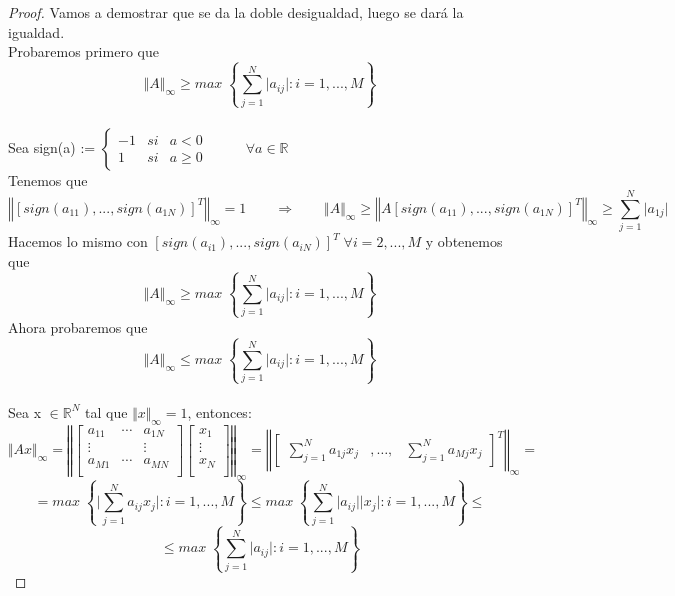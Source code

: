 \begin{proof} Vamos a demostrar que se da la doble desigualdad, luego se dará la igualdad.\\
Probaremos primero que $$ \Vert A \Vert _\infty \geq max \; \left\lbrace \sum_{j=1}^N \vert a_{ij} \vert : i = 1,...,M \right\rbrace $$\\
Sea sign(a) := $\left\{ \begin{array}{lcc}
-1 & si & a < 0 \\
1 & si & a \geq 0
\end{array}
\right.$ $\qquad$ $\forall a \in \mathbb{R}$\\
Tenemos que
\[ \left\Vert \left[ sign(a_{11}),...,sign(a_{1N}) \right] ^T \right\Vert _\infty = 1 \qquad \Rightarrow \qquad \Vert A \Vert _\infty \geq \left\Vert A \left[ sign(a_{11}),...,sign(a_{1N}) \right] ^T \right\Vert _\infty \geq \sum_{j=1}^N \vert a_{1j} \vert \]
Hacemos lo mismo con $\left[ sign(a_{i1}),...,sign(a_{iN}) \right] ^T \; \forall i = 2,...,M$ y obtenemos que
\[ \Vert A \Vert _\infty \geq max \; \left\lbrace \sum_{j=1}^N \vert a_{ij} \vert : i = 1,...,M \right\rbrace \]
Ahora probaremos que $$ \Vert A \Vert _\infty \leq max \; \left\lbrace \sum_{j=1}^N \vert a_{ij} \vert : i = 1,...,M \right\rbrace $$\\
Sea x $\in \mathbb{R}^N$ tal que $\Vert x \Vert _\infty = 1$, entonces:
\[ \Vert Ax \Vert _\infty = \left\Vert 
\begin{bmatrix} 
a_{11} &  \cdots & a_{1N} \\
\vdots & & \vdots 
\\ a_{M1} & \cdots & a_{MN} \\ \end{bmatrix} 
\begin{bmatrix}
x_1 \\
\vdots \\
x_N \\
\end{bmatrix}
\right\Vert _\infty = \left\Vert 
\begin{bmatrix}
\sum_{j=1}^N a_{1j}x_j & ,\ldots , & \sum_{j=1}^N a_{Mj}x_j 
\end{bmatrix} ^T
\right\Vert _\infty = \] \[= max \; \left\lbrace \vert \sum_{j=1}^N a_{ij}x_j \vert : i = 1,...,M \right\rbrace \leq max \; \left\lbrace \sum_{j=1}^N \vert a_{ij} \vert \vert x_j \vert : i = 1,...,M \right\rbrace \leq \] \[ \leq max \; \left\lbrace \sum_{j=1}^N \vert a_{ij} \vert : i = 1,...,M \right\rbrace \] 
\end{proof}

